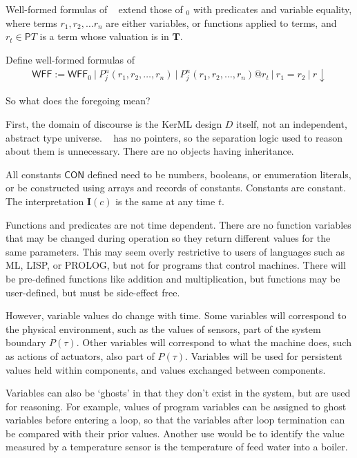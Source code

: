  Well-formed formulas of \logicid~ extend those of \logicid$_0$ with predicates and variable equality, where terms $r_1, r_2, \ldots r_n$ are either variables, or functions applied to terms,
 and $r_t \in \mathsf PT$ is a term whose valuation is in $\mathbf{T}$.
 
 \begin{definition} {Define well-formed formulas of \logicid}
\begin{align}
\mathsf{WFF}:= \mathsf{WFF}_0~\vert~ P^n_j(r_1,r_2,\ldots,r_n)~ \vert~ P^n_j(r_1,r_2,\ldots,r_n)@r_t~ \vert~ r_1 = r_2~\vert~r\!\downarrow \label{eq:blwff}\tag{BL-wff}
\end{align}
\end{definition}

 So what does the foregoing mean?

 First, the domain of discourse is the KerML design $D$ itself, not an independent, abstract type universe.
  \lang~ has no pointers, so the separation logic used to reason about them is unnecessary.  There are no objects having inheritance.

All constants $\mathsf{CON}$ defined need to be numbers, booleans, or enumeration literals, or be constructed using arrays and records of constants.  Constants are constant.  The interpretation $\mathbf{I}(c)$ is the same at any time $t$.

 Functions and predicates are not time dependent.  There are no function variables that may be changed during operation so they return different values for the same parameters.  This may seem overly restrictive to users of languages such as ML, LISP, or PROLOG, but not for programs that control machines.  There will be pre-defined functions like addition and multiplication, but functions may be user-defined, but must be side-effect free.

However, variable values do change with time.  Some variables will correspond to the physical environment, such as the values of sensors, part of the system boundary $P(\tau)$.  Other variables will correspond to what the machine does, such as actions of actuators, also part of $P(\tau)$.  Variables will be used for persistent values held within components, and values exchanged between components.

Variables can also be `ghosts' in that they don't exist in the system, but are used for reasoning.  For example, values of program variables can be assigned to ghost variables before entering a loop, so that the variables after loop termination can be compared with their prior values.  Another use would be to identify the value measured by a temperature sensor is the temperature of feed water into a boiler.
 
